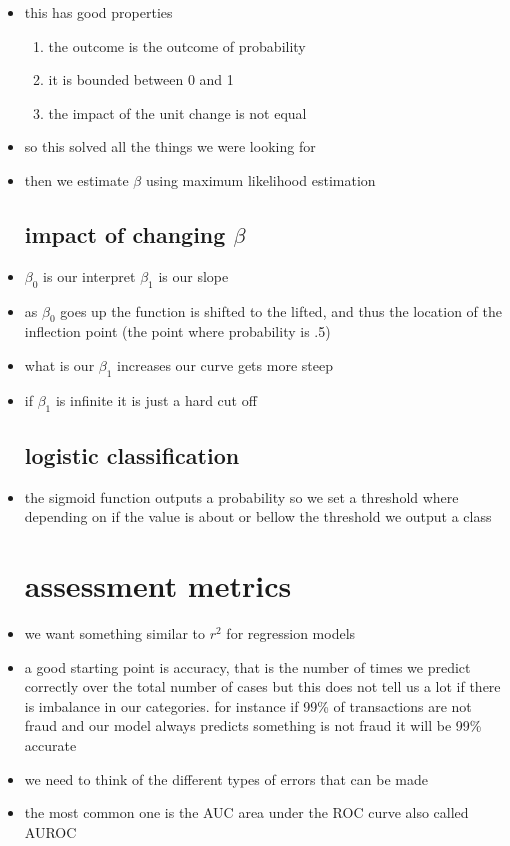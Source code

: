 \documentclass{article}
\begin{document}
\begin{itemize}
\item this has good properties
\begin{enumerate}
    \item the outcome is the outcome of probability
    \item it is bounded between 0 and 1 
    \item the impact of the unit change is not equal
\end{enumerate}
\item so this solved all the things we were looking for 
\item then we estimate $\beta$ using maximum likelihood estimation 
\subsection{impact of changing $\beta$}
\item $\beta_0$ is our interpret $\beta_1$ is our slope
\item as $\beta_0$ goes up the function is shifted to the lifted, and thus the location of the inflection point (the point where probability is .5)
\item what is our $\beta_1$ increases our curve gets more steep
\item if $\beta_1$ is infinite it is just a hard cut off 
\subsection{logistic classification}
\item the sigmoid function outputs a probability so we set a threshold where depending on if the value is about or bellow the threshold we output a class

\section{assessment metrics}
\item we want something similar to $r^2$ for regression models
\item a good starting point is accuracy,  that is the number of times we predict correctly over the total number of cases but this does not tell us a lot if there is imbalance in our categories. for instance if 99\% of transactions are not fraud and our model always predicts something is not fraud it will be 99\% accurate
\item we need to think of the different types of errors that can be made
\item the most common one is the AUC area under the ROC curve also called AUROC

\end{itemize}
\end{document}
